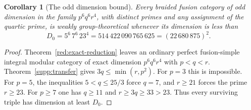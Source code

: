 \documentclass[11pt,a4paper]{article}
\numberwithin{equation}{section}
\newtheorem{corollary}[theorem]{Corollary}
\begin{document}
\begin{corollary}[The odd dimension bound]\label{supp:odd-frontier}
Every braided fusion category of odd dimension in the family
$p^6q^6r^4$, with distinct primes and any assignment of the
quartic prime, is weakly group-theoretical whenever its dimension
is less than
\[
 D_0=5^6\,7^6\,23^4
       =514\,422\,090\,765\,625=(22\,680\,875)^2.
\]
\end{corollary}
\begin{proof}
Theorem~\ref{red:exact-reduction} leaves
an ordinary perfect fusion-simple integral modular category
of exact dimension $p^6q^6r^4$ with $p<q<r$.
Theorem~\ref{supp:transfer} gives
$3q\le\min(r,p^2)$. For $p=3$ this is impossible.
For $p=5$, the inequalities $5<q\le25/3$ force $q=7$,
and $r\ge21$ forces the prime $r\ge23$.
For $p\ge7$ one has $q\ge11$ and $r\ge3q\ge33>23$.
Thus every surviving triple has dimension at least $D_0$.
\end{proof}
\end{document}
